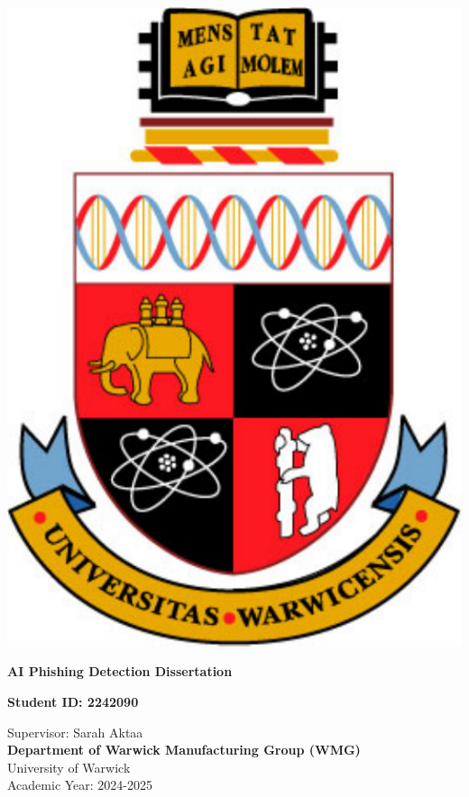 \thispagestyle{empty}

\begin{spacing}{2}
    \begin{center}

        \includegraphics[scale=0.45]{preamble/warwick-crest.pdf}
        \vspace{10mm}

        \textbf{\LARGE AI Phishing Detection Dissertation}
        \vspace{20mm}

        {\large \textbf{Student ID: 2242090}}
        \vspace{20mm}

        {\large Supervisor: Sarah Aktaa}\\
        \textbf{\large Department of Warwick Manufacturing Group (WMG)}\\
        {\large University of Warwick}\\
        {\large Academic Year: 2024-2025}

    \end{center}
\end{spacing}

